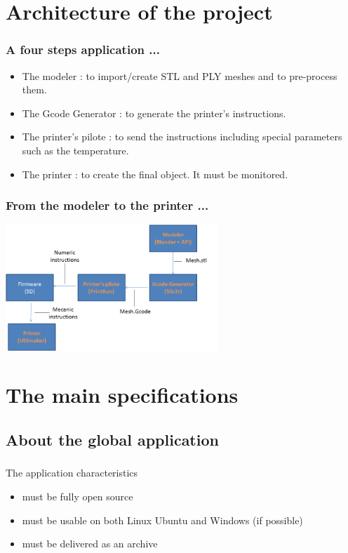 \documentclass{beamer}
\begin{document}
\section{Architecture of the project}

\begin{frame}
	\frametitle{A four steps application ... }
	
	\begin{block}{}
	\begin{itemize}
	\item The modeler : to import/create STL and PLY meshes and to pre-process them.
	\item The Gcode Generator : to generate the printer's instructions.
	\item The printer's pilote : to send the instructions including special parameters such as the temperature.
	\item The printer : to create the final object. It must be monitored.
	\end{itemize}
	\end{block}
	
\end{frame}


\begin{frame}
	\frametitle{From the modeler to the printer ...}

    \begin{center}
		\includegraphics[width=8cm]{ARD1}	
	\end{center}
	
\end{frame}

\section{The main specifications}

\subsection{About the global application}
\begin{frame}
	\frametitle{}
	 \begin{block}{The application characteristics}
		\begin{itemize}
			\item must be fully open source
			\item must be usable on both Linux Ubuntu and Windows (if possible)
			\item must be delivered as an archive
		\end{itemize}
    \end{block}
\end{frame}
    
\end{document}

